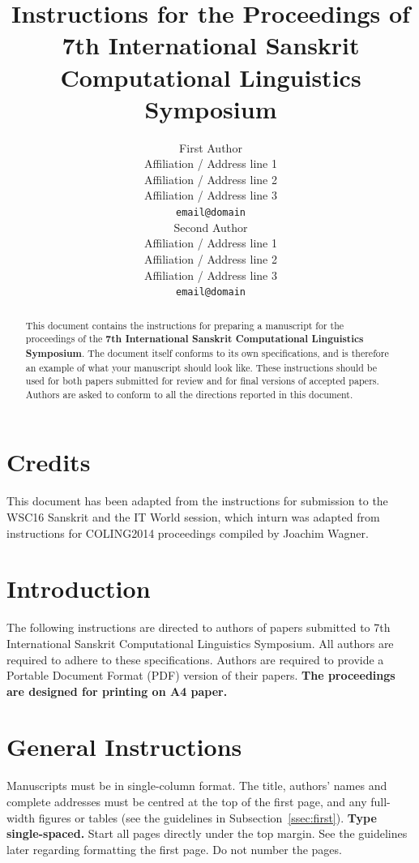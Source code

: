 \documentclass[11pt]{article}
\title{Instructions for the Proceedings of \\7th International Sanskrit Computational Linguistics Symposium}
\author{First Author \\
  Affiliation / Address line 1 \\
  Affiliation / Address line 2 \\
  Affiliation / Address line 3 \\
  {\tt email@domain} \\\And
  Second Author \\
  Affiliation / Address line 1 \\
  Affiliation / Address line 2 \\
  Affiliation / Address line 3 \\
  {\tt email@domain} \\}
\date{}
\begin{document}
\maketitle
\begin{abstract}
  This document contains the instructions for preparing a
  manuscript for the proceedings of the \textbf{7th International Sanskrit Computational Linguistics Symposium}. 
  The document itself
  conforms to its own specifications, and is therefore an example of
  what your manuscript should look like. These instructions should be
  used for both papers submitted for review and for final versions of
  accepted papers.  Authors are asked to conform to all the directions
  reported in this document.
\end{abstract}

\section{Credits}

This document has been adapted from the instructions for submission to the WSC16 Sanskrit
and the IT World session, which inturn was adapted from instructions for  COLING2014
proceedings compiled by Joachim Wagner. 

\section{Introduction}
\label{intro}

%
% 
\blfootnote{
}

The following instructions are directed to authors of papers submitted
to 7th International Sanskrit Computational Linguistics Symposium.  All
authors are required to adhere to these specifications. Authors are
required to provide a Portable Document Format (PDF) version of their
papers. \textbf{The proceedings are designed for printing on A4
  paper.}

\section{General Instructions}

Manuscripts must be in single-column format.
The title, authors' names and complete
addresses
must be centred at the top of the first page, and
any full-width figures or tables (see the guidelines in
Subsection~\ref{ssec:first}). {\bf Type single-spaced.}  Start all
pages directly under the top margin. See the guidelines later
regarding formatting the first page.  
Do not number the pages.
\end{document}
